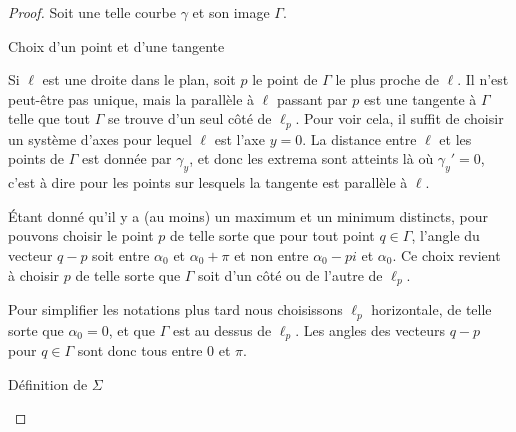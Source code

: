\begin{proof}
    Soit une telle courbe \( \gamma\) et son image \( \Gamma\). 
    \begin{subproof}
        \item[Choix d'un point et d'une tangente]
            
            Si \( \ell\) est une droite dans le plan, soit \( p\) le point de \( \Gamma\) le plus proche de \( \ell\). Il n'est peut-être pas unique, mais la parallèle à \( \ell\) passant par \( p\) est une tangente à \( \Gamma\) telle que tout \( \Gamma\) se trouve d'un seul côté de \( \ell_p\). Pour voir cela, il suffit de choisir un système d'axes pour lequel \( \ell\) est l'axe \( y=0\). La distance entre \( \ell\) et les points de \( \Gamma\) est donnée par \( \gamma_y\), et donc les extrema sont atteints là où \( \gamma_y'=0\), c'est à dire pour les points sur lesquels la tangente est parallèle à \( \ell\).

            Étant donné qu'il y a (au moins) un maximum et un minimum distincts, pour pouvons choisir le point \( p\) de telle sorte que pour tout point \( q\in \Gamma\), l'angle du vecteur \( q-p\) soit entre \( \alpha_0\) et \( \alpha_0+\pi\) et non entre \( \alpha_0-pi\) et \( \alpha_0\). Ce choix revient à choisir \( p\) de telle sorte que \( \Gamma\) soit d'un côté ou de l'autre de \( \ell_p\).

            Pour simplifier les notations plus tard nous choisissons \( \ell_p\) horizontale, de telle sorte que \( \alpha_0=0\), et que \( \Gamma\) est au dessus de \( \ell_p\). Les angles des vecteurs \( q-p\) pour \( q\in \Gamma\) sont donc tous entre \( 0\) et \( \pi\).

        \item[Définition de \( \Sigma\)]


\end{subproof}
\end{proof}
